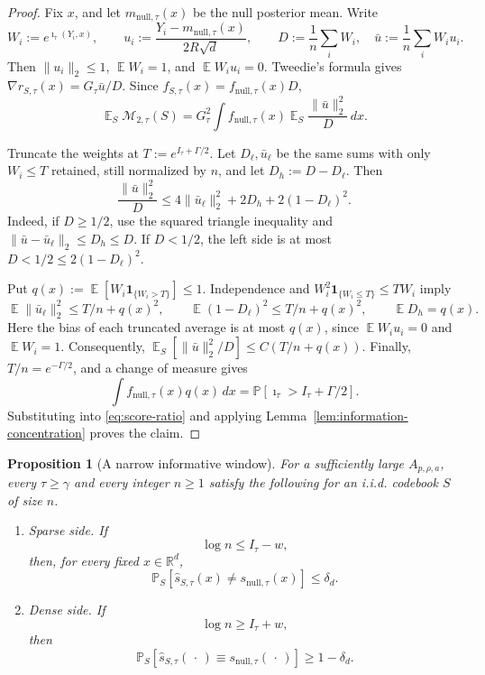 \documentclass[11pt,letterpaper]{article}
\newtheorem{proposition}[theorem]{Proposition}
\newcommand{\R}{\mathbb{R}}
\DeclareMathOperator*{\E}{\mathbb{E}}
\newcommand{\1}{\mathbbm{1}}
\newcommand{\Prob}{\mathbb P}
\begin{document}
\begin{proof}
Fix \(x\), and let \(m_{\mathrm{null},\tau}(x)\) be the null
posterior mean.  Write
\[
   W_i:=e^{\imath_\tau(Y_i,x)},\qquad
   u_i:=\frac{Y_i-m_{\mathrm{null},\tau}(x)}{2R\sqrt d},
   \qquad
   D:=\frac1n\sum_iW_i,\quad \bar u:=\frac1n\sum_iW_i u_i.
\]
Then \(\|u_i\|_2\le1\), \(\E W_i=1\), and \(\E W_i u_i=0\).
Tweedie's formula gives \(\nabla r_{S,\tau}(x)=G_\tau\bar u/D\).
Since \(f_{S,\tau}(x)=f_{\mathrm{null},\tau}(x)D\),
\begin{equation}\label{eq:score-ratio}
   \E_S\mathcal M_{2,\tau}(S)
   =G_\tau^2\int f_{\mathrm{null},\tau}(x)
          \E_S\frac{\|\bar u\|_2^2}{D}\,dx.
\end{equation}

Truncate the weights at \(T:=e^{I_\tau+\Gamma/2}\).  Let
\(D_\ell,\bar u_\ell\) be the same sums with only \(W_i\le T\) retained,
still normalized by \(n\), and let \(D_h:=D-D_\ell\).
Then
\[
   \frac{\|\bar u\|_2^2}{D}
   \le4\|\bar u_\ell\|_2^2+2D_h+2(1-D_\ell)^2.
\]
Indeed, if \(D\ge1/2\), use the squared triangle inequality and
\(\|\bar u-\bar u_\ell\|_2\le D_h\le D\).  If \(D<1/2\), the left side
is at most \(D<1/2\le2(1-D_\ell)^2\).

Put \(q(x):=\E[W_i\mathbf1_{\{W_i>T\}}]\le1\).
Independence and \(W_i^2\mathbf1_{\{W_i\le T\}}\le T W_i\) imply
\[
   \E\|\bar u_\ell\|_2^2\le T/n+q(x)^2,\qquad
   \E(1-D_\ell)^2\le T/n+q(x)^2,\qquad
   \E D_h=q(x).
\]
Here the bias of each truncated average is at most \(q(x)\),
since \(\E W_i u_i=0\) and \(\E W_i=1\).
Consequently, \(\E_S[\|\bar u\|_2^2/D]\le C(T/n+q(x))\).
Finally, \(T/n=e^{-\Gamma/2}\), and a change of measure gives
\[
   \int f_{\mathrm{null},\tau}(x)q(x)\,dx
   =\Prob[\imath_\tau>I_\tau+\Gamma/2].
\]
Substituting into \eqref{eq:score-ratio} and applying
Lemma~\ref{lem:information-concentration} proves the claim.
\end{proof}

\begin{proposition}[A narrow informative window]\label{prop:window}
For a sufficiently large \(A_{p,\rho,a}\), every \(\tau\ge\gamma\) and
every integer \(n\ge1\) satisfy the following for an i.i.d. codebook
\(S\) of size \(n\).

\begin{enumerate}[label=\textup{(\alph*)},leftmargin=2.2em]
   \item \emph{Sparse side.}  If
   \[
      \log n\le I_\tau-w,
   \]
   then, for every fixed \(x\in\R^d\),
   \[
      \Prob_S\left[
         \widehat s_{S,\tau}(x)\ne s_{\mathrm{null},\tau}(x)
      \right]\le\delta_d.
   \]

   \item \emph{Dense side.}  If
   \[
      \log n\ge I_\tau+w,
   \]
   then
   \[
      \Prob_S\left[
         \widehat s_{S,\tau}(\,\cdot\,)
         \equiv s_{\mathrm{null},\tau}(\,\cdot\,)
      \right]\ge1-\delta_d.
   \]
\end{enumerate}
\end{proposition}
\end{document}
